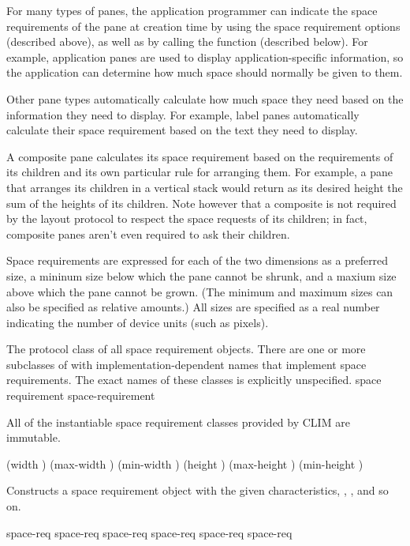 For many types of panes, the application programmer can indicate the space
requirements of the pane at creation time by using the space requirement options
(described above), as well as by calling the 
function (described below).  For example, application panes are used to display
application-specific information, so the application can determine how much
space should normally be given to them.

Other pane types automatically calculate how much space they need based on the
information they need to display.  For example, label panes automatically
calculate their space requirement based on the text they need to display.

A composite pane calculates its space requirement based on the requirements of
its children and its own particular rule for arranging them.  For example, a
pane that arranges its children in a vertical stack would return as its desired
height the sum of the heights of its children.  Note however that a composite is
not required by the layout protocol to respect the space requests of its
children; in fact, composite panes aren't even required to ask their children.

Space requirements are expressed for each of the two dimensions as a preferred
size, a mininum size below which the pane cannot be shrunk, and a maxium size
above which the pane cannot be grown.  (The minimum and maximum sizes can also
be specified as relative amounts.)  All sizes are specified as a real number
indicating the number of device units (such as pixels).



The protocol class of all space requirement objects.  There are one or more
subclasses of  with implementation-dependent names that
implement space requirements.  The exact names of these classes is explicitly
unspecified.
 {space requirement} {space-requirement}

All of the instantiable space requirement classes provided by CLIM are
immutable.


 {\key (width ) (max-width ) (min-width )
                                      (height ) (max-height ) (min-height )}

Constructs a space requirement object with the given characteristics, ,
, and so on.

             {space-req}
         {space-req}
         {space-req}
            {space-req}
        {space-req}
        {space-req}

